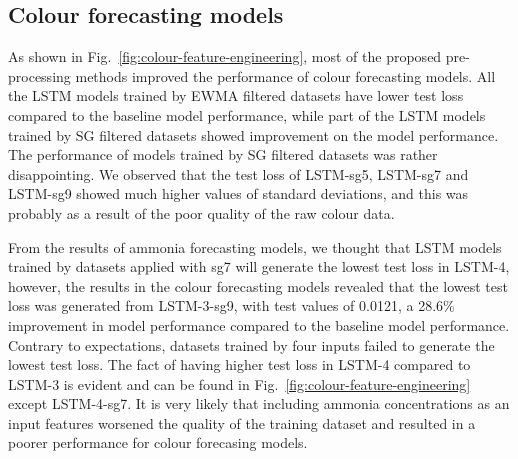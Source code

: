\subsection{Colour forecasting models}

As shown in Fig.~\ref{fig:colour-feature-engineering}, most of the proposed pre-processing methods improved the performance of colour forecasting models. All the LSTM models trained by EWMA filtered datasets have lower test loss compared to the baseline model performance, while part of the LSTM models trained by SG filtered datasets showed improvement on the model performance. The performance of models trained by SG filtered datasets was rather disappointing. We observed that the test loss of LSTM-sg5, LSTM-sg7 and LSTM-sg9 showed much higher values of standard deviations, and this was probably as a result of the poor quality of the raw colour data. 

From the results of ammonia forecasting models, we thought that LSTM models trained by datasets applied with sg7 will generate the lowest test loss in LSTM-4, however, the results in the colour forecasting models revealed that the lowest test loss was generated from LSTM-3-sg9, with test values of 0.0121, a 28.6\% improvement in model performance compared to the baseline model performance. Contrary to expectations, datasets trained by four inputs failed to generate the lowest test loss. The fact of having higher test loss in LSTM-4 compared to LSTM-3 is evident and can be found in Fig.~\ref{fig:colour-feature-engineering} except LSTM-4-sg7. It is very likely that including ammonia concentrations as an input features worsened the quality of the training dataset and resulted in a poorer performance for colour forecasing models.




